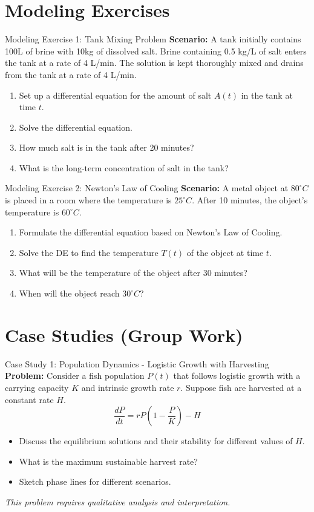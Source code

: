 \documentclass[10pt,aspectratio=169]{beamer}
\newcommand{\concept}[1]{\textbf{#1}}
\newcommand{\formula}[1]{\textit{#1}}
\newcommand{\emphasis}[1]{\textit{#1}}
\begin{document}
\section{Modeling Exercises}
\begin{frame}{Modeling Exercise 1: Tank Mixing Problem}
    \concept{Scenario:} A tank initially contains 100L of brine with 10kg of dissolved salt. Brine containing 0.5 kg/L of salt enters the tank at a rate of 4 L/min. The solution is kept thoroughly mixed and drains from the tank at a rate of 4 L/min.
    \begin{enumerate}
        \item Set up a differential equation for the amount of salt $A(t)$ in the tank at time $t$.
        \item Solve the differential equation.
        \item How much salt is in the tank after 20 minutes?
        \item What is the long-term concentration of salt in the tank?
    \end{enumerate}
\end{frame}

\begin{frame}{Modeling Exercise 2: Newton's Law of Cooling}
    \concept{Scenario:} A metal object at $80^\circ C$ is placed in a room where the temperature is $25^\circ C$. After 10 minutes, the object's temperature is $60^\circ C$.
    \begin{enumerate}
        \item Formulate the differential equation based on Newton's Law of Cooling.
        \item Solve the DE to find the temperature $T(t)$ of the object at time $t$.
        \item What will be the temperature of the object after 30 minutes?
        \item When will the object reach $30^\circ C$?
    \end{enumerate}
\end{frame}

\section{Case Studies (Group Work)}
\begin{frame}{Case Study 1: Population Dynamics - Logistic Growth with Harvesting}
    \concept{Problem:} Consider a fish population $P(t)$ that follows logistic growth with a carrying capacity $K$ and intrinsic growth rate $r$. Suppose fish are harvested at a constant rate $H$.
    \formula{\[ \frac{dP}{dt} = rP\left(1-\frac{P}{K}\right) - H \]}
    \begin{itemize}
        \item Discuss the equilibrium solutions and their stability for different values of $H$.
        \item What is the maximum sustainable harvest rate?
        \item Sketch phase lines for different scenarios.
    \end{itemize}
    \emphasis{This problem requires qualitative analysis and interpretation.}
\end{frame}
\end{document}
